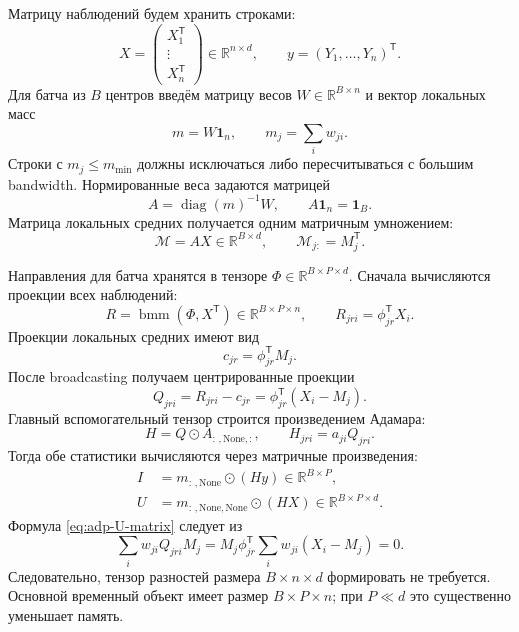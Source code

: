Матрицу наблюдений будем хранить строками:
\[
X=
\begin{pmatrix}
X_1^{\mathsf T}\\[-1mm]
\vdots\\[-1mm]
X_n^{\mathsf T}
\end{pmatrix}
\in\mathbb R^{n\times d},
\qquad
y=(Y_1,\ldots,Y_n)^{\mathsf T}.
\]
Для батча из $B$ центров введём матрицу весов
$W\in\mathbb R^{B\times n}$ и вектор локальных масс
\begin{equation}
m=W\mathbf 1_n,
\qquad m_j=\sum_iw_{ji}.
\label{eq:adp-mass}
\end{equation}
Строки с $m_j\leq m_{\min}$ должны исключаться либо пересчитываться с большим bandwidth.
Нормированные веса задаются матрицей
\begin{equation}
A=\operatorname{diag}(m)^{-1}W,
\qquad A\mathbf 1_n=\mathbf 1_B.
\label{eq:adp-normalized-weights}
\end{equation}
Матрица локальных средних получается одним матричным умножением:
\begin{equation}
\mathcal M=AX\in\mathbb R^{B\times d},
\qquad \mathcal M_{j:}=M_j^{\mathsf T}.
\label{eq:adp-means-matmul}
\end{equation}

Направления для батча хранятся в тензоре
$\Phi\in\mathbb R^{B\times P\times d}$.
Сначала вычисляются проекции всех наблюдений:
\begin{equation}
R=\operatorname{bmm}(\Phi,X^{\mathsf T})
\in\mathbb R^{B\times P\times n},
\qquad
R_{jri}=\phi_{jr}^{\mathsf T}X_i.
\label{eq:adp-raw-projections}
\end{equation}
Проекции локальных средних имеют вид
\begin{equation}
c_{jr}=\phi_{jr}^{\mathsf T}M_j.
\label{eq:adp-projected-mean}
\end{equation}
После broadcasting получаем центрированные проекции
\begin{equation}
Q_{jri}=R_{jri}-c_{jr}
       =\phi_{jr}^{\mathsf T}(X_i-M_j).
\label{eq:adp-Q}
\end{equation}
Главный вспомогательный тензор строится произведением Адамара:
\begin{equation}
H=Q\odot A_{:\,,\mathrm{None},:},
\qquad
H_{jri}=a_{ji}Q_{jri}.
\label{eq:adp-H}
\end{equation}
Тогда обе статистики вычисляются через матричные произведения:
\begin{align}
I
&=
 m_{:\,,\mathrm{None}}\odot(Hy)
\in\mathbb R^{B\times P},
\label{eq:adp-I-matrix}
\\
U
&=
 m_{:\,,\mathrm{None},\mathrm{None}}
 \odot(HX)
\in\mathbb R^{B\times P\times d}.
\label{eq:adp-U-matrix}
\end{align}
Формула \eqref{eq:adp-U-matrix} следует из
\[
\sum_iw_{ji}Q_{jri}M_j
=M_j\phi_{jr}^{\mathsf T}\sum_iw_{ji}(X_i-M_j)=0.
\]
Следовательно, тензор разностей размера $B\times n\times d$ формировать не требуется.
Основной временный объект имеет размер $B\times P\times n$; при $P\ll d$
это существенно уменьшает память.

